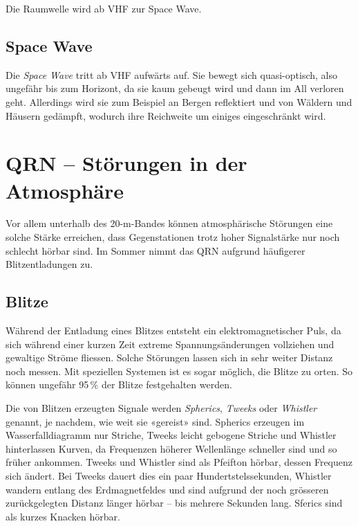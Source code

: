 Die Raumwelle wird ab VHF zur Space Wave.

\subsection{Space Wave}
Die \textit{Space Wave} tritt ab VHF aufwärts auf. Sie bewegt sich quasi-optisch, also ungefähr bis zum Horizont, da sie kaum gebeugt wird und dann im All verloren geht. Allerdings wird sie zum Beispiel an Bergen reflektiert und von Wäldern und Häusern gedämpft, wodurch ihre Reichweite um einiges eingeschränkt wird. 

\section{QRN – Störungen in der Atmosphäre}
Vor allem unterhalb des 20-m-Bandes können atmosphärische Störungen eine solche Stärke erreichen, dass Gegenstationen trotz hoher Signalstärke nur noch schlecht hörbar sind. Im Sommer nimmt das QRN aufgrund häufigerer Blitzentladungen zu.

\subsection{Blitze}\label{sec:blitze}
Während der Entladung eines Blitzes entsteht ein elektromagnetischer Puls, da sich während einer kurzen Zeit extreme Spannungsänderungen vollziehen und gewaltige Ströme fliessen. Solche Störungen lassen sich in sehr weiter Distanz noch messen. Mit speziellen Systemen ist es sogar möglich, die Blitze zu orten. So können ungefähr 95\,\% der Blitze festgehalten werden.

Die von Blitzen erzeugten Signale werden \textit{Spherics}, \textit{Tweeks} oder \textit{Whistler} genannt, je nachdem, wie weit sie «gereist» sind. Spherics erzeugen im Wasserfalldiagramm nur Striche, Tweeks leicht gebogene Striche und Whistler hinterlassen Kurven, da Frequenzen höherer Wellenlänge schneller sind und so früher ankommen. Tweeks und Whistler sind als Pfeifton hörbar, dessen Frequenz sich ändert. Bei Tweeks dauert dies ein paar Hundertstelssekunden, Whistler wandern entlang des Erdmagnetfeldes und sind aufgrund der noch grösseren zurückgelegten Distanz länger hörbar – bis mehrere Sekunden lang. Sferics sind als kurzes Knacken hörbar.

